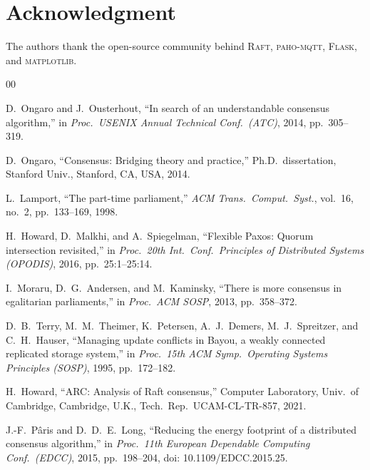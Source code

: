 \documentclass[conference]{IEEEtran}
\newcommand{\raftproto}{\textsc{Raft}\xspace}
\begin{document}
\section*{Acknowledgment}
The authors thank the open-source community behind \raftproto,
\textsc{paho-mqtt}, \textsc{Flask}, and \textsc{matplotlib}.

\begin{thebibliography}{00}

D.~Ongaro and J.~Ousterhout, ``In search of an understandable consensus
algorithm,'' in \emph{Proc.\ USENIX Annual Technical Conf.\ (ATC)},
2014, pp.~305--319.

D.~Ongaro, ``Consensus: Bridging theory and practice,'' Ph.D.\
dissertation, Stanford Univ., Stanford, CA, USA, 2014.

L.~Lamport, ``The part-time parliament,'' \emph{ACM Trans.\ Comput.\
Syst.}, vol.~16, no.~2, pp.~133--169, 1998.

H.~Howard, D.~Malkhi, and A.~Spiegelman, ``Flexible Paxos: Quorum
intersection revisited,'' in \emph{Proc.\ 20th Int.\ Conf.\ Principles
of Distributed Systems (OPODIS)}, 2016, pp.~25:1--25:14.

I.~Moraru, D.~G.~Andersen, and M.~Kaminsky, ``There is more consensus in
egalitarian parliaments,'' in \emph{Proc.\ ACM SOSP}, 2013,
pp.~358--372.

D.~B.~Terry, M.~M.~Theimer, K.~Petersen, A.~J.~Demers, M.~J.~Spreitzer,
and C.~H.~Hauser, ``Managing update conflicts in Bayou, a weakly
connected replicated storage system,'' in \emph{Proc.\ 15th ACM Symp.\
Operating Systems Principles (SOSP)}, 1995, pp.~172--182.

\bibitem{howard2021arc}
H.~Howard, ``ARC: Analysis of Raft consensus,'' Computer Laboratory,
Univ.\ of Cambridge, Cambridge, U.K., Tech.\ Rep.\ UCAM-CL-TR-857, 2021.

\bibitem{paris2015reducing}
J.-F.~P{\^a}ris and D.~D.~E.~Long, ``Reducing the energy footprint of a
distributed consensus algorithm,'' in \emph{Proc.\ 11th European
Dependable Computing Conf.\ (EDCC)}, 2015, pp.~198--204, doi:
10.1109/EDCC.2015.25.


\end{thebibliography}
\end{document}
